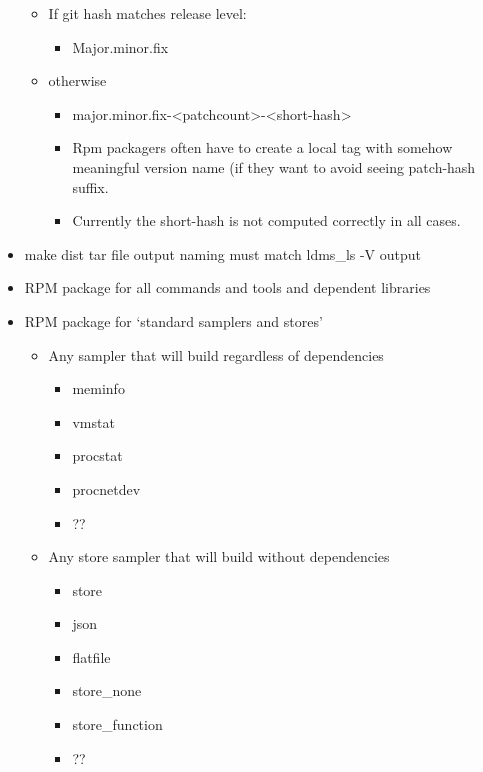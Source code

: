 \documentclass{article}
\begin{document}
\begin{itemize}
\begin{itemize}
        \item If git hash matches release level:
            \begin{itemize}
                \item Major.minor.fix
            \end{itemize}
        \item otherwise
            \begin{itemize}
                    \item major.minor.fix-<patchcount>-<short-hash>
                    \item Rpm packagers often have to create a local tag with somehow meaningful version name (if they want to avoid seeing patch-hash suffix.
                    \item Currently the short-hash is not computed correctly in all cases.
            \end{itemize}
       \end{itemize}
    \item make dist tar file output naming must match ldms\_ls -V output
    \item RPM package for all commands and tools and dependent libraries
    \item RPM package for ‘standard samplers and stores’
        \begin{itemize}
            \item Any sampler that will build regardless of dependencies
                \begin{itemize}
                    \item meminfo
                    \item vmstat
                    \item procstat
                    \item procnetdev
                    \item ??
                \end{itemize}
            \item Any store sampler that will build without dependencies
               \begin{itemize}
                    \item store
                    \item json
                    \item flatfile
                    \item store\_none
                    \item store\_function
                    \item ??

\end{itemize}
\end{itemize}
\end{itemize}
\end{document}

